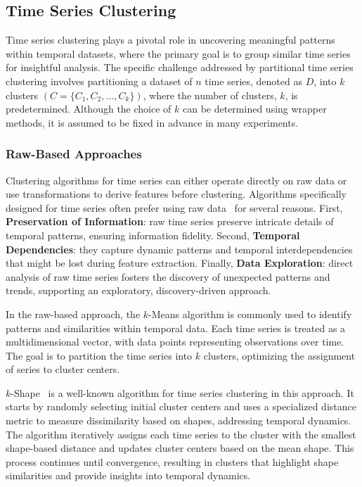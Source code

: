\subsection{Time Series Clustering}
\label{sec:clus_methods}
Time series clustering plays a pivotal role in uncovering meaningful patterns within temporal datasets, where the primary goal is to group similar time series for insightful analysis. The specific challenge addressed by partitional time series clustering involves partitioning a dataset of $n$ time series, denoted as $D$, into $k$ clusters $(C = \{C_{1}, C_{2}, ..., C_{k}\})$, where the number of clusters, $k$, is predetermined. Although the choice of $k$ can be determined using wrapper methods, it is assumed to be fixed in advance in many experiments. 

\subsubsection{Raw-Based Approaches}

Clustering algorithms for time series can either operate directly on raw data or use transformations to derive features before clustering. Algorithms specifically designed for time series often prefer using raw data~\cite{liao2005clustering} for several reasons. First, \textbf{Preservation of Information}: raw time series preserve intricate details of temporal patterns, ensuring information fidelity. Second, \textbf{Temporal Dependencies}: they capture dynamic patterns and temporal interdependencies that might be lost during feature extraction. Finally, \textbf{Data Exploration}: direct analysis of raw time series fosters the discovery of unexpected patterns and trends, supporting an exploratory, discovery-driven approach.

In the raw-based approach, the $k$-Means algorithm is commonly used to identify patterns and similarities within temporal data. Each time series is treated as a multidimensional vector, with data points representing observations over time. The goal is to partition the time series into $k$ clusters, optimizing the assignment of series to cluster centers.

$k$-Shape~\cite{10.1145/2949741.2949758} is a well-known algorithm for time series clustering in this approach. It starts by randomly selecting initial cluster centers and uses a specialized distance metric to measure dissimilarity based on shapes, addressing temporal dynamics. The algorithm iteratively assigns each time series to the cluster with the smallest shape-based distance and updates cluster centers based on the mean shape. This process continues until convergence, resulting in clusters that highlight shape similarities and provide insights into temporal dynamics.

